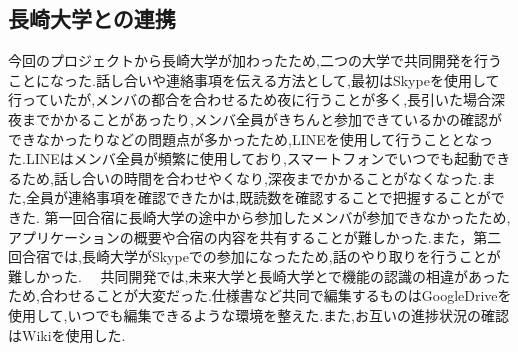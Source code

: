\subsection{長崎大学との連携}
 今回のプロジェクトから長崎大学が加わったため,二つの大学で共同開発を行うことになった.話し合いや連絡事項を伝える方法として,最初はSkypeを使用して行っていたが,メンバの都合を合わせるため夜に行うことが多く,長引いた場合深夜までかかることがあったり,メンバ全員がきちんと参加できているかの確認ができなかったりなどの問題点が多かったため,LINEを使用して行うこととなった.LINEはメンバ全員が頻繁に使用しており,スマートフォンでいつでも起動できるため,話し合いの時間を合わせやくなり,深夜までかかることがなくなった.また,全員が連絡事項を確認できたかは,既読数を確認することで把握することができた.
 第一回合宿に長崎大学の途中から参加したメンバが参加できなかったため,アプリケーションの概要や合宿の内容を共有することが難しかった.また，第二回合宿では,長崎大学がSkypeでの参加になったため,話のやり取りを行うことが難しかった.
　共同開発では,未来大学と長崎大学とで機能の認識の相違があったため,合わせることが大変だった.仕様書など共同で編集するものはGoogleDriveを使用して,いつでも編集できるような環境を整えた.また,お互いの進捗状況の確認はWikiを使用した.
